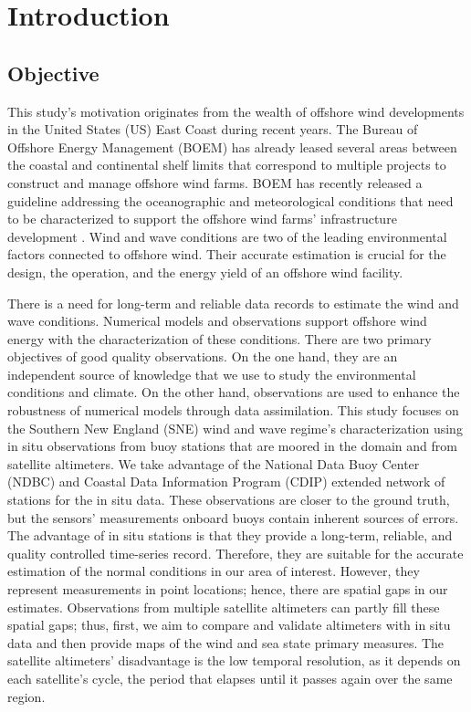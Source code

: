 
\chapter{Introduction} %

\label{Chapter1} %


\section{Objective}


This study's motivation originates from the wealth of offshore wind developments in the United States (US) East Coast during recent years. The Bureau of Offshore Energy Management (BOEM) has already leased several areas between the coastal and continental shelf limits that correspond to multiple projects to construct and manage offshore wind farms. BOEM has recently released a guideline addressing the oceanographic and meteorological conditions that need to be characterized to support the offshore wind farms' infrastructure development \cite{DNVGL2018}. Wind and wave conditions are two of the leading environmental factors connected to offshore wind. Their accurate estimation is crucial for the design, the operation, and the energy yield of an offshore wind facility.

There is a need for long-term and reliable data records to estimate the wind and wave conditions. Numerical models and observations support offshore wind energy with the characterization of these conditions. There are two primary objectives of good quality observations. On the one hand, they are an independent source of knowledge that we use to study the environmental conditions and climate. On the other hand, observations are used to enhance the robustness of numerical models through data assimilation. This study focuses on the Southern New England (SNE) wind and wave regime's characterization using in situ observations from buoy stations that are moored in the domain and from satellite altimeters. We take advantage of the National Data Buoy Center (NDBC) and Coastal Data Information Program (CDIP) extended network of stations for the in situ data. These observations are closer to the ground truth, but the sensors' measurements onboard buoys contain inherent sources of errors. The advantage of in situ stations is that they provide a long-term, reliable, and quality controlled time-series record. Therefore, they are suitable for the accurate estimation of the normal conditions in our area of interest. However, they represent measurements in point locations; hence, there are spatial gaps in our estimates. Observations from multiple satellite altimeters can partly fill these spatial gaps; thus, first, we aim to compare and validate altimeters with in situ data and then provide maps of the wind and sea state primary measures. The satellite altimeters' disadvantage is the low temporal resolution, as it depends on each satellite’s cycle, the period that elapses until it passes again over the same region.



